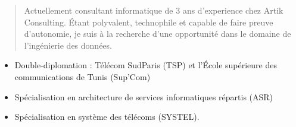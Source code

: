 \documentclass[9pt,a4paper,ragged2e,normalphoto]{altacv}
\begin{document}

\begin{fullwidth}
\makecvheader
\end{fullwidth}


\begin{quote}
Actuellement consultant informatique de 3 ans d'experience chez Artik Consulting.
Étant polyvalent, technophile et capable de faire preuve d'autonomie, je suis à la recherche d'une opportunité  dans le domaine de l'ingénierie des données.
\end{quote}



\begin{itemize}
\item Double-diplomation : Télécom SudParis (TSP) et l'École supérieure des communications de Tunis (Sup'Com)
\item Spécialisation en architecture de services informatiques répartis (ASR)
\item Spécialisation en système des télécoms (SYSTEL).
\end{itemize}

\begin{comment}

\cvevent{e}{Institut Préparatoire aux Études d'Ingénieurs El Manar (IPEIEM), Tunisie}{Septembre 2014 -- Juin 2016}{}
\begin{itemize}
\item Diplôme d'études universitaires de premier cycle en MP.
\end{itemize}
\divider

\cvevent{Baccalauréat}{Lycée les pères blancs, Tunisie}{juin 2014}{}
\begin{itemize}
\item Section: Mathématique - Moyenne: 15.96/20
\end{itemize}

\end{comment}
\end{document}
